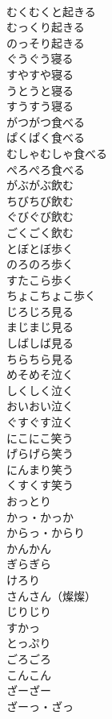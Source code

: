 \documentclass[8pt]{extreport}
\begin{document}
\begin{CJK}{UTF8}{min}
\\	むくむくと起きる	
\\	むっくり起きる	
\\	のっそり起きる	
\\	ぐうぐう寝る	
\\	すやすや寝る	
\\	うとうと寝る	
\\	すうすう寝る	
\\	がつがつ食べる	
\\	ぱくぱく食べる	
\\	むしゃむしゃ食べる	
\\	ぺろぺろ食べる	
\\	がぶがぶ飲む	
\\	ちびちび飲む	
\\	ぐびぐび飲む	
\\	ごくごく飲む	
\\	とぼとぼ歩く	
\\	のろのろ歩く	
\\	すたこら歩く	
\\	ちょこちょこ歩く	
\\	じろじろ見る	
\\	まじまじ見る	
\\	しばしば見る	
\\	ちらちら見る	
\\	めそめそ泣く	
\\	しくしく泣く	
\\	おいおい泣く	
\\	ぐすぐす泣く	
\\	にこにこ笑う	
\\	げらげら笑う	
\\	にんまり笑う	
\\	くすくす笑う	
\\	おっとり	
\\	かっ・かっか	
\\	からっ・からり	
\\	かんかん	
\\	ぎらぎら	
\\	けろり	
\\	さんさん（燦燦）	
\\	じりじり	
\\	すかっ	
\\	とっぷり	
\\	ごろごろ	
\\	こんこん	
\\	ざーざー	
\\	ざーっ・ざっ	

\end{CJK}
\end{document}
